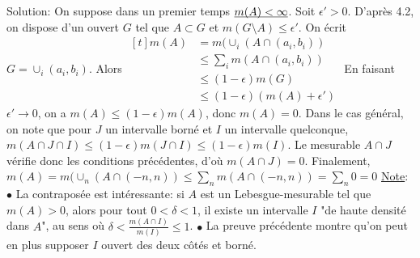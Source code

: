 \documentclass{report}
\begin{document}
Solution: On suppose dans un premier temps $\underline{\smash{m(A)<\infty}}$. \newline Soit $\epsilon' >0$. D'après 4.2, on dispose d'un ouvert $G$ tel que $A\subset G$ et $m(G\setminus A)\leq \epsilon'$. \newline On écrit $G = \cup_i (a_i,b_i)$. Alors $\begin{aligned}[t] m(A) &= m(\cup_i (A\cap (a_i,b_i))\\ &\leq \sum_i m(A\cap (a_i,b_i)) \\ &\leq (1-\epsilon) m(G) \\ &\leq (1-\epsilon)(m(A) + \epsilon') \end{aligned}$\newline 
En faisant $\epsilon' \to 0$, on a $m(A) \leq (1-\epsilon)m(A)$, donc $m(A) = 0$.\newline \newline
Dans le cas général, on note que pour $J$ un intervalle borné et $I$  un intervalle quelconque, $m(A\cap J \cap I) \leq (1-\epsilon)m(J\cap I) \leq (1-\epsilon)m(I)$. \newline Le mesurable $A\cap J$ vérifie donc les conditions précédentes, d'où $m(A\cap J)=0$. \newline
Finalement, $m(A) = m(\cup_n (A\cap (-n,n))\leq \sum_n m(A\cap (-n,n)) = \sum_n 0 = 0$ \newline \newline
\underline{Note}: $\bullet$ La contraposée est intéressante: si $A$ est un Lebesgue-mesurable tel que $m(A)>0$, alors pour tout $0<\delta<1$, il existe un intervalle $I$ "de haute densité dans $A$", au sens où $\delta < \frac{m(A\cap I)}{m(I)}\leq 1$. \newline 
$\bullet$ La preuve précédente montre qu'on peut en plus supposer $I$ ouvert des deux côtés et borné.
\newpage 

\subsection{}  \\ \\
\end{document}
